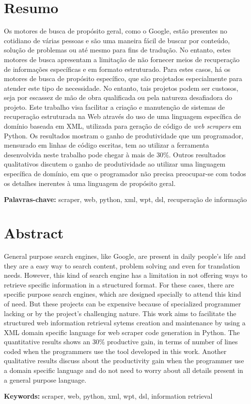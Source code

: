 \cleardoublepage
{}
\chapter*{Resumo}
\thispagestyle{fancy}
Os motores de busca de propósito geral, como o Google, estão presentes no cotidiano de várias pessoas e são uma maneira fácil de buscar por conteúdo, solução de problemas ou até mesmo para fins de tradução. No entanto, estes motores de busca apresentam a limitação de não fornecer meios de recuperação de informações específicas e em formato estruturado. Para estes casos, há os motores de busca de propósito específico, que são projetados especialmente para atender este tipo de necessidade. No entanto, tais projetos podem ser custosos, seja por escassez de mão de obra qualificada ou pela natureza desafiadora do projeto. Este trabalho visa facilitar a criação e manutenção de sistemas de recuperação estruturada na Web através do uso de uma linguagem específica de domínio baseada em XML, utilizada para geração de código de \emph{web scrapers} em Python. Os resultados mostram o ganho de produtividade que um programador, mensurado em linhas de código escritas, tem ao utilizar a ferramenta desenvolvida neste trabalho pode chegar à mais de 30\%. Outros resultados qualitativos discutem o ganho de produtividade ao utilizar uma linguagem específica de domínio, em que o programador não precisa preocupar-se com todos os detalhes inerentes à uma linguagem de propósito geral.
	
	\textbf{Palavras-chave:} scraper, web, python, xml, wpt, dsl, recuperação de informação

\cleardoublepage
{}
\chapter*{Abstract}
\thispagestyle{fancy}
General purpose search engines, like Google, are present in daily people's life and they are a easy way to search content, problem solving and even for translation needs. However, this kind of search engine has a limitation in not offering ways to retrieve specific information in a structured format. For these cases, there are specific purpose search engines, which are designed specially to attend this kind of need. But these projects can be expensive because of specialized programmer lacking or by the project's challenging nature. This work aims to facilitate the structured web information retrieval sytems creation and maintenance by using a XML domain specific language for web scraper code generation in Python. The quantitative results shows an 30\% productive gain, in terms of number of lines coded when the programmers use the tool developed in this work. Another qualitative results discuss about the productivity gain when the programmer use a domain specific language and do not need to worry about all details present in a general purpose language.

	\textbf{Keywords:} scraper, web, python, xml, wpt, dsl, information retrieval
